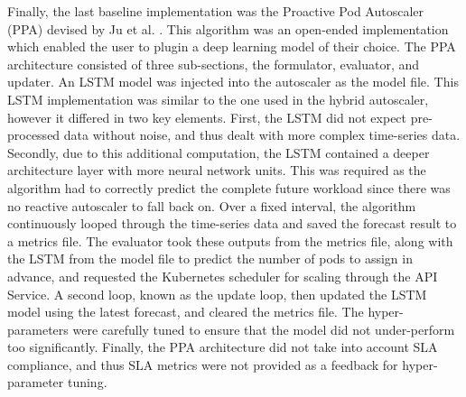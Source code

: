 Finally, the last baseline implementation was the Proactive Pod Autoscaler (PPA) devised by Ju et al. \cite{ju2021proactive}. This algorithm was an open-ended implementation which enabled the user to plugin a deep learning model of their choice. The PPA architecture consisted of three sub-sections, the formulator, evaluator, and updater. An LSTM model was injected into the autoscaler as the model file. This LSTM implementation was similar to the one used in the hybrid autoscaler, however it differed in two key elements. First, the LSTM did not expect pre-processed data without noise, and thus dealt with more complex time-series data. Secondly, due to this additional computation, the LSTM contained a deeper architecture layer with more neural network units. This was required as the algorithm had to correctly predict the complete future workload since there was no reactive autoscaler to fall back on. Over a fixed interval, the algorithm continuously looped through the time-series data and saved the forecast result to a metrics file. The evaluator took these outputs from the metrics file, along with the LSTM from the model file to predict the number of pods to assign in advance, and requested the Kubernetes scheduler for scaling through the API Service. A second loop, known as the update loop, then updated the LSTM model using the latest forecast, and cleared the metrics file. The hyper-parameters were carefully tuned to ensure that the model did not under-perform too significantly. Finally, the PPA architecture did not take into account SLA compliance, and thus SLA metrics were not provided as a feedback for hyper-parameter tuning.\par


